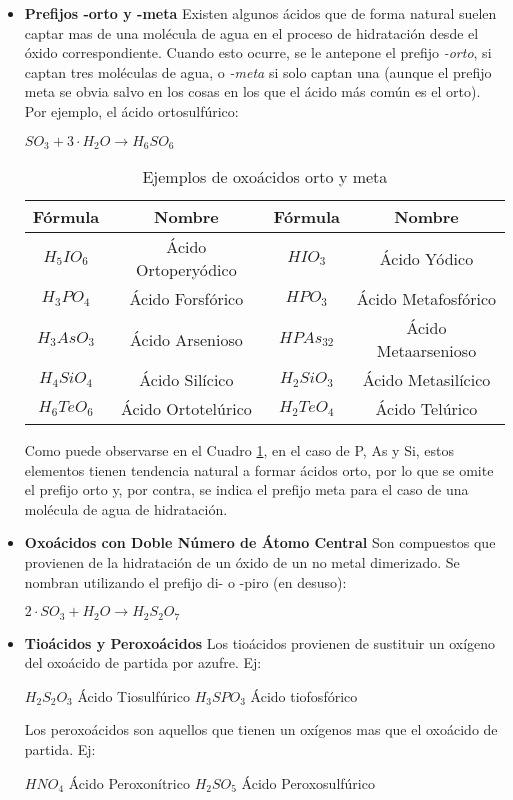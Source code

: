 \begin{itemize}
	\item \textbf{Prefijos -orto y -meta} Existen algunos ácidos que de forma natural suelen captar mas de una molécula de agua en el proceso de hidratación desde el óxido correspondiente. Cuando esto ocurre, se le antepone el prefijo \emph{-orto}, si captan tres moléculas de agua, o \emph{-meta} si solo captan una (aunque el prefijo meta se obvia salvo en los cosas en los que el ácido más común es el orto). Por ejemplo, el ácido ortosulfúrico:
	\begin{center}
		$SO_3 + 3\cdot H_{2}O \longrightarrow  H_{6}SO_{6}$
	\end{center}
	\begin{table}[h!]
		\centering
		\begin{tabular}{c|c|c|c}
			Fórmula&Nombre&Fórmula&Nombre\\ \hline
			$H_{5}IO_{6}$&Ácido Ortoperyódico&$HIO_{3}$&Ácido Yódico\\
			$H_{3}PO_{4}$&Ácido Forsfórico&$HPO_{3}$&Ácido Metafosfórico\\
			$H_{3}AsO_{3}$&Ácido Arsenioso&$HPAs_{32}$&Ácido Metaarsenioso\\
			$H_{4}SiO_{4}$&Ácido Silícico&$H_{2}SiO_{3}$&Ácido Metasilícico\\
			$H_{6}TeO_{6}$&Ácido Ortotelúrico&$H_{2}TeO_{4}$&Ácido Telúrico\\ \hline
		\end{tabular}
		\caption{Ejemplos de oxoácidos orto y meta}
		\label{tab:orto}
	\end{table}
	Como puede observarse en el Cuadro \ref{tab:orto}, en el caso de P, As y Si, estos elementos tienen tendencia natural a formar ácidos orto, por lo que se omite el prefijo orto y, por contra, se indica el prefijo meta para el caso de una molécula de agua de hidratación.\\
	
	\item \textbf{Oxoácidos con Doble Número de Átomo Central} Son compuestos que provienen de la hidratación de un óxido de un no metal dimerizado. Se nombran utilizando el prefijo di- o -piro (en desuso):
	\begin{center}
		$2\cdot SO_3 + H_{2}O \rightarrow H_{2}S_{2}O_{7}$
	\end{center}
	\item \textbf{Tioácidos y Peroxoácidos} Los tioácidos provienen de sustituir un oxígeno del oxoácido de partida por azufre. Ej:
	\begin{center}
		$H_{2}S_{2}O_{3}$   Ácido Tiosulfúrico \hspace{1cm} $H_{3}SPO_3$ Ácido tiofosfórico
	\end{center}
	Los peroxoácidos son aquellos que tienen un oxígenos mas que el oxoácido de partida. Ej:
	\begin{center}
		$HNO_4$    Ácido Peroxonítrico \hspace{1cm} $H_{2}SO_5$   Ácido Peroxosulfúrico
	\end{center}
	
\end{itemize}

